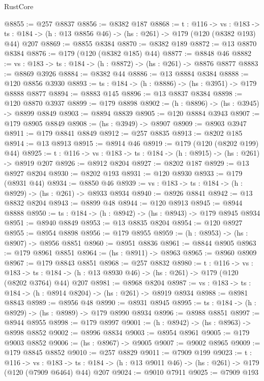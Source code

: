 \begin{lexlean}{RustCore}
\begin{coremodule}
@8855 := @257 @8837
@8856 := @8382 @187
@8868 := {t : @116} ->
  {vs : @183} ->
  {ts : @184} -> (h : @13 @8856 @46) -> (hs : @261) -> @179 (@120 (@8382 @193) @44) @207
@8869 := @8855 @8384
@8870 := @8382 @189
@8872 := @13 @8870 @8384
@8876 := @179 (@120 (@8382 @185) @44)
@8877 := @8848 @46
@8882 := {vs : @183} -> {ts : @184} -> (h : @8872) -> (hs : @261) -> @8876 @8877
@8883 := @8869 @3926
@8884 := @8382 @44
@8886 := @13 @8884 @8384
@8888 := @120 @8856 @3930
@8893 := {ts : @184} -> (h : @8886) -> (hs : @3951) -> @179 @8888 @8877
@8894 := @8883 @145
@8896 := @13 @8837 @8384
@8898 := @120 @8870 @3937
@8899 := @179 @8898
@8902 := (h : @8896) -> (hs : @3945) -> @8899 @8849
@8903 := @8894 @8839
@8905 := @120 @8884 @3943
@8907 := @179 @8905 @8849
@8908 := (hs : @3949) -> @8907
@8909 := @8903 @3947
@8911 := @179 @8841 @8849
@8912 := @257 @8835
@8913 := @8202 @185
@8914 := @13 @8913
@8915 := @8914 @46
@8919 := @179 (@120 (@8202 @199) @44)
@8925 := {t : @116} -> {vs : @183} -> {ts : @184} -> (h : @8915) -> (hs : @261) -> @8919 @207
@8926 := @8912 @8204
@8927 := @8202 @187
@8929 := @13 @8927 @8204
@8930 := @8202 @193
@8931 := @120 @8930
@8933 := @179 (@8931 @44)
@8934 := @8850 @46
@8939 := {vs : @183} -> {ts : @184} -> (h : @8929) -> (hs : @261) -> @8933 @8934
@8940 := @8926 @8841
@8942 := @13 @8832 @8204
@8943 := @8899 @48
@8944 := @120 @8913
@8945 := @8944 @8888
@8950 := {ts : @184} -> (h : @8942) -> (hs : @8943) -> @179 @8945 @8934
@8951 := @8940 @8849
@8953 := @13 @8835 @8204
@8954 := @120 @8927
@8955 := @8954 @8898
@8956 := @179 @8955
@8959 := (h : @8953) -> (hs : @8907) -> @8956 @8851
@8960 := @8951 @8836
@8961 := @8844 @8905
@8963 := @179 @8961 @8851
@8964 := (hs : @8911) -> @8963
@8965 := @8960 @8909
@8967 := @179 @8843 @8851
@8968 := @257 @8832
@8980 := {t : @116} ->
  {vs : @183} ->
  {ts : @184} -> (h : @13 @8930 @46) -> (hs : @261) -> @179 (@120 (@8202 @3764) @44) @207
@8981 := @8968 @8204
@8987 := {vs : @183} -> {ts : @184} -> (h : @8914 @8204) -> (hs : @261) -> @8919 @8934
@8988 := @8981 @8843
@8989 := @8956 @48
@8990 := @8931 @8945
@8995 := {ts : @184} -> (h : @8929) -> (hs : @8989) -> @179 @8990 @8934
@8996 := @8988 @8851
@8997 := @8944 @8955
@8998 := @179 @8997
@9001 := (h : @8942) -> (hs : @8963) -> @8998 @8852
@9002 := @8996 @8834
@9003 := @8954 @8961
@9005 := @179 @9003 @8852
@9006 := (hs : @8967) -> @9005
@9007 := @9002 @8965
@9009 := @179 @8845 @8852
@9010 := @257 @8829
@9011 := @7909 @199
@9023 := {t : @116} ->
  {vs : @183} ->
  {ts : @184} -> (h : @13 @9011 @46) -> (hs : @261) -> @179 (@120 (@7909 @6464) @44) @207
@9024 := @9010 @7911
@9025 := @7909 @193

\end{coremodule}
\end{lexlean}
